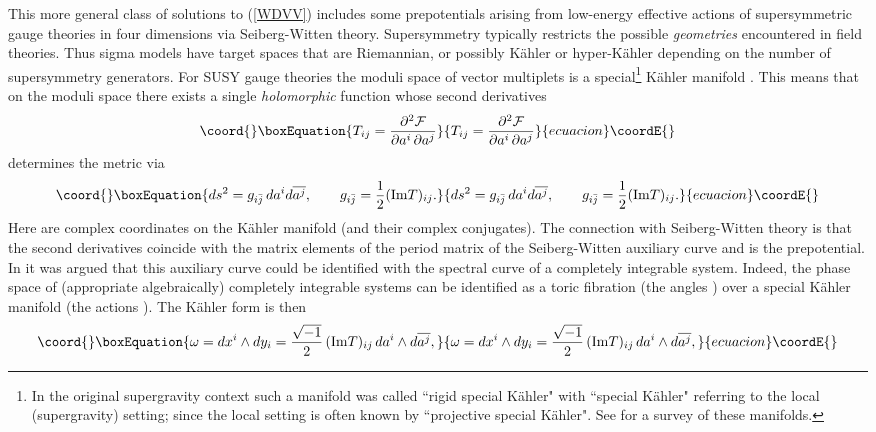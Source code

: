 \documentclass[a4paper,]{article}
\def\d{\partial}
\def\Im{{\rm Im}}
\def\N2{\myHighlight{${\cal N}=2$}\coordHE{}}
\def\F{{\cal F}}
\begin{document}
This more general class of solutions to (\ref{WDVV}) includes
some prepotentials arising from 
low-energy effective actions of \N2 supersymmetric gauge theories in four 
dimensions via Seiberg-Witten theory.
Supersymmetry typically restricts the possible {\em geometries} encountered in
field theories. Thus sigma models have target spaces that
are Riemannian, or possibly K\"ahler or hyper-K\"ahler depending on 
the number of supersymmetry generators. 
For \N2 SUSY gauge theories the moduli space of vector multiplets 
is a special\footnote{
In the original supergravity context such a manifold was called
``rigid special K\"ahler" with ``special K\"ahler" referring to the
local (supergravity) setting; since \cite{Freed} the local setting is
often known by ``projective special K\"ahler". See \cite{cortes}
for a survey of these manifolds.}
K\"ahler manifold \cite{speKa,SW}.
This means that on the moduli space there exists a single {\em holomorphic} 
function \myHighlight{$\F ({\bf a})$}\coordHE{} whose second derivatives
\begin{equation}\coord{}\boxEquation{
\label{pematr}
T_{ij} =\dfrac{\d^2\F}{\d a\sp{i}\,\d a{\sp{j}}}
}{
T_{ij} =\dfrac{\d^2\F}{\d a\sp{i}\,\d a{\sp{j}}}
}{ecuacion}\coordE{}\end{equation}
determines the metric via
\begin{equation}\coord{}\boxEquation{
\label{metric}
ds\sp2= g_{i{\bar j}}\,d a\sp{i} d\overline{ a\sp{j}},\qquad
g_{i{\bar j}}=\dfrac{1}{2}(\Im T)_{ij}.
}{
ds\sp2= g_{i{\bar j}}\,d a\sp{i} d\overline{ a\sp{j}},\qquad
g_{i{\bar j}}=\dfrac{1}{2}(\Im T)_{ij}.
}{ecuacion}\coordE{}\end{equation}
Here \coordHE{} are complex coordinates on the  K\"ahler manifold
(and \coordHE{} their complex conjugates). The connection
with Seiberg-Witten theory is that the second derivatives \coordHE{} 
coincide with the matrix elements of the period matrix of the
Seiberg-Witten auxiliary curve and \myHighlight{$\F$}\coordHE{} is the prepotential.
In \cite{GKMMM} it was argued that this auxiliary curve could be identified
with the spectral curve of a completely integrable system. Indeed, the phase
space of (appropriate algebraically) completely integrable systems can
be identified as a toric fibration (the angles \coordHE{}) over a special 
K\"ahler manifold (the actions \coordHE{}). The K\"ahler form is then
\begin{equation}\coord{}\boxEquation{
\label{kform}
\omega=dx\sp{i}\wedge dy_i
=\dfrac{\sqrt{-1}}{2}\, (\Im T)_{ij}\, d a\sp{i}\wedge d\overline{ a\sp{j}},
}{
\omega=dx\sp{i}\wedge dy_i
=\dfrac{\sqrt{-1}}{2}\, (\Im T)_{ij}\, d a\sp{i}\wedge d\overline{ a\sp{j}},
}{ecuacion}\coordE{}\end{equation}
\end{document}
